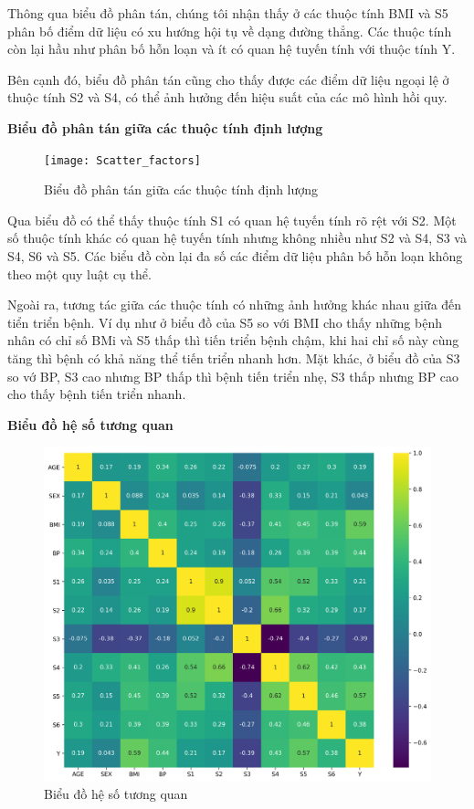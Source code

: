 \documentclass[runningheads]{llncs}
\begin{document}
Thông qua biểu đồ phân tán, chúng tôi nhận thấy ở các thuộc tính BMI và S5 phân bố điểm dữ liệu có xu hướng hội tụ về dạng đường thẳng. Các thuộc tính còn lại hầu như phân bố hỗn loạn và ít có quan hệ tuyến tính với thuộc tính Y.

Bên cạnh đó, biểu đồ phân tán cũng cho thấy được các điểm dữ liệu ngoại lệ ở thuộc tính S2 và S4, có thể ảnh hưởng đến hiệu suất của các mô hình hồi quy.

\vspace{0.5cm}
\textbf{Biểu đồ phân tán giữa các thuộc tính định lượng}

\begin{figure}[H]
\centering
\texttt{[image: Scatter\_factors]}
\caption{Biểu đồ phân tán giữa các thuộc tính định lượng} \label{fig2}
\end{figure}

Qua biểu đồ có thể thấy thuộc tính S1 có quan hệ tuyến tính rõ rệt với S2. Một số thuộc tính khác có quan hệ tuyến tính nhưng không nhiều như S2 và S4, S3 và S4, S6 và S5. Các biểu đồ còn lại đa số các điểm dữ liệu phân bố hỗn loạn không theo một quy luật cụ thể.

Ngoài ra, tương tác giữa các thuộc tính có những ảnh hưởng khác nhau giữa đến tiển triển bệnh. Ví dụ như ở biểu đồ của S5 so với BMI cho thấy những bệnh nhân có chỉ số BMi và S5 thấp thì tiến triển bệnh chậm, khi hai chỉ số này cùng tăng thì bệnh có khả năng thể tiến triển nhanh hơn. Mặt khác, ở biểu đồ của S3 so vớ BP, S3 cao nhưng BP thấp thì bệnh tiến triển nhẹ, S3 thấp nhưng BP cao cho thấy bệnh tiến triển nhanh.

\vspace{0.5cm}
\textbf{Biểu đồ hệ số tương quan}
\begin{figure}[H]
\centering
\includegraphics[width=\textwidth]{Corr}
\caption{Biểu đồ hệ số tương quan} \label{fig2}
\end{figure}
\end{document}
